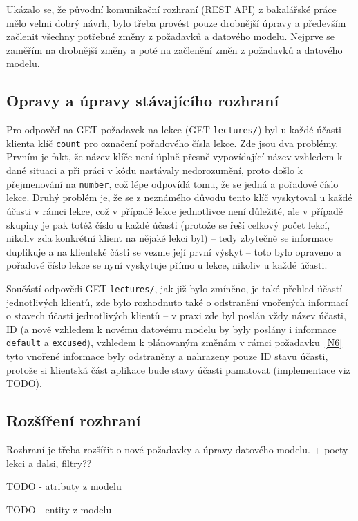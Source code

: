 Ukázalo se, že původní komunikační rozhraní (REST API) z bakalářské práce mělo velmi dobrý návrh, bylo třeba provést pouze drobnější úpravy a především začlenit všechny potřebné změny z požadavků a datového modelu. Nejprve se zaměřím na drobnější změny a poté na začlenění změn z požadavků a datového modelu.

\subsection{Opravy a úpravy stávajícího rozhraní}

Pro odpověď na GET požadavek na lekce (GET \verb|lectures/|) byl u každé účasti klienta klíč \verb|count| pro označení pořadového čísla lekce. Zde jsou dva problémy. Prvním je fakt, že název klíče není úplně přesně vypovídající název vzhledem k dané situaci a při práci v kódu nastávaly nedorozumění, proto došlo k přejmenování na \verb|number|, což lépe odpovídá tomu, že se jedná a pořadové číslo lekce. Druhý problém je, že se z neznámého důvodu tento klíč vyskytoval u každé účasti v rámci lekce, což v případě lekce jednotlivce není důležité, ale v případě skupiny je pak totéž číslo u každé účasti (protože se řeší celkový počet lekcí, nikoliv zda konkrétní klient na nějaké lekci byl) -- tedy zbytečně se informace duplikuje a na klientské části se vezme její první výskyt -- toto bylo opraveno a pořadové číslo lekce se nyní vyskytuje přímo u lekce, nikoliv u každé účasti.

Součástí odpovědi GET \verb|lectures/|, jak již bylo zmíněno, je také přehled účastí jednotlivých klientů, zde bylo rozhodnuto také o odstranění vnořených informací o stavech účasti jednotlivých klientů -- v praxi zde byl poslán vždy název účasti, ID (a nově vzhledem k novému datovému modelu by byly poslány i informace \verb|default| a \verb|excused|), vzhledem k plánovaným změnám v rámci požadavku~\ref{N6} tyto vnořené informace byly odstraněny a nahrazeny pouze ID stavu účasti, protože si klientská část aplikace bude stavy účasti pamatovat (implementace viz TODO).


\subsection{Rozšíření rozhraní}

Rozhraní je třeba rozšířit o nové požadavky a úpravy datového modelu. 
+ pocty lekci a dalsi, filtry??

TODO - atributy z modelu

TODO - entity z modelu

